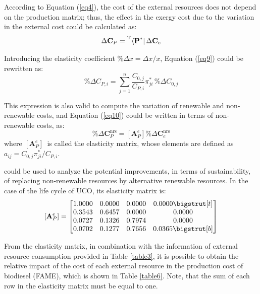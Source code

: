 \documentclass[sustainability,article,accept,moreauthors,pdftex,12pt,a4paper]{mdpi}
\newcommand{\tmopcr}[1]{\ensuremath{\prescript{\mathrm{T}}{}{\left\langle {\textbf{#1}^\ast } \right|}}}
\newcommand{\vm}[1]{\ensuremath{\mathbf{#1}}}
\newcommand{\vms}[3][\phantom{\ast}]{\ensuremath{\mathbf{#2}_{#3}^\mathrm{#1}}}
\newcommand{\elm}{\ensuremath{\left[\vm{A}_P^e\right]}}
\begin{document}
According to Equation (\ref{eq4}), the cost of the external resources does not depend on the production matrix; thus, the effect in the exergy cost due to the variation in the external cost could be calculated as:
%
\begin{equation}
 \Delta \vm{C}_P =\tmopcr{P} \, \Delta\vm{C}_e
 \label{eq9}
\end{equation}

Introducing the elasticity coefficient $\%\Delta x = \Delta x / x$, Equation (\ref{eq9}) could be rewritten as:
\begin{equation}
\%\Delta C_{P,i}=\sum\limits_{j=1}^{n}{\frac{C_{0,j}}{C_{P,i}}\pi_{ji}^{\ast}}\,\%\Delta C_{0,j}
\label{eq10}
\end{equation}

This expression is also valid to compute the variation of renewable and non-renewable costs, and Equation
(\ref{eq10}) could be written in terms of non-renewable costs, as:
%
\begin{equation}
\label{eq11}
\%\Delta \vms[nrs]{C}{P}= \elm \% \Delta \vms[nrs]{C}{e}
\end{equation}
\noindent where \elm~is called the elasticity matrix, whose elements are defined as $a_{ij}=C_{0,j}\pi_{ji}^*/C_{P,i}$. 

 could be used to analyze the potential improvements, in terms of sustainability, of replacing non-renewable resources by alternative renewable resources. In the case of the life cycle of UCO, its elasticity matrix is:
%
\[
\elm=\begin{bmatrix} 
1.0000 & 0.0000 & 0.0000 & 0.0000 \bigstrut[t]\\
0.3543 & 0.6457 & 0.0000 & 0.0000 \\
0.0727 & 0.1326 & 0.7974 & 0.0000 \\
0.0702 & 0.1277 & 0.7656 & 0.0365 \bigstrut[b]\\
\end{bmatrix}
\]

From the elasticity matrix, in combination with the information of external resource consumption provided in Table \ref{table3}, it is possible to obtain the relative impact of the cost of each external resource in the production cost of biodiesel (FAME), which is shown in Table \ref{table6}. Note, that the sum of each row in the elasticity matrix must be equal to one.
\end{document}
